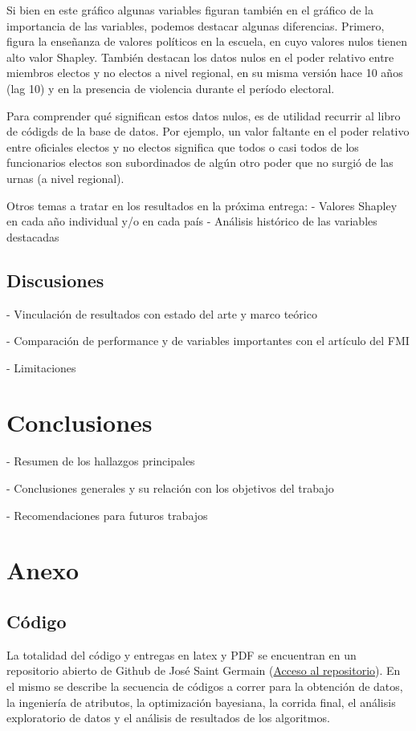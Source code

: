 \documentclass{article}
\begin{document}
Si bien en este gráfico algunas variables figuran también en el gráfico de la importancia
de las variables, podemos destacar algunas diferencias. Primero, figura la enseñanza de 
valores políticos en la escuela, en cuyo valores nulos tienen alto valor Shapley. También 
destacan los datos nulos en el poder relativo entre miembros electos y no electos a nivel 
regional, en su misma versión hace 10 años (lag 10) y en la presencia de violencia durante 
el período electoral.

Para comprender qué significan estos datos nulos, es de utilidad recurrir al libro de 
códigds de la base de datos. Por ejemplo, un valor faltante en el poder relativo entre 
oficiales electos y no electos significa que todos o casi todos de los funcionarios 
electos son subordinados de algún otro poder que no surgió de las urnas (a nivel
regional).

Otros temas a tratar en los resultados en la próxima entrega:
- Valores Shapley en cada año individual y/o en cada país
- Análisis histórico de las variables destacadas

\subsection{Discusiones}
- Vinculación de resultados con estado del arte y marco teórico

- Comparación de performance y de variables importantes con el artículo del FMI

- Limitaciones 

\section{Conclusiones}
- Resumen de los hallazgos principales

- Conclusiones generales y su relación con los objetivos del trabajo

- Recomendaciones para futuros trabajos


\section{Anexo}
\subsection{Código}
La totalidad del código y entregas en latex y PDF se encuentran en un repositorio abierto de
Github de José Saint Germain (\href{https://github.com/josesg998/esp_data_mining}{Acceso al 
repositorio}). En el mismo se describe la secuencia de códigos a correr para la obtención de 
datos, la ingeniería de atributos, la optimización bayesiana, la corrida final, el análisis 
exploratorio de datos y el análisis de resultados de los algoritmos.
\end{document}
